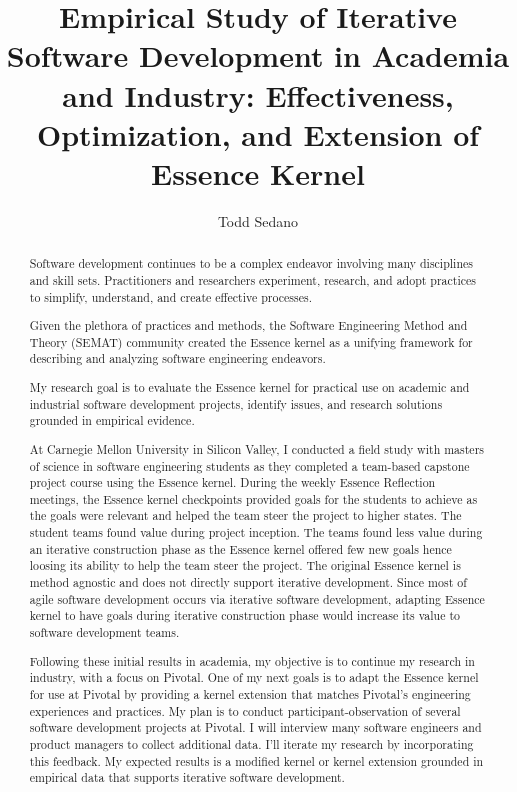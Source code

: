 \documentclass[preprint,12pt,3p]{elsarticle}
\begin{document}
\begin{frontmatter}

\title{Empirical Study of Iterative Software Development in Academia and Industry: Effectiveness, Optimization, and Extension of Essence Kernel}

\author{Todd Sedano}


\address{Carnegie Mellon University}
\address{Silicon Valley Campus}
\address{Moffett Field, CA 94035, USA}


\begin{abstract}
Software development continues to be a complex endeavor involving many disciplines and skill sets. Practitioners and researchers experiment, research, and adopt practices to simplify, understand, and create effective processes. 

Given the plethora of practices and methods, the Software Engineering Method and Theory (SEMAT) community created the Essence kernel as a unifying framework for describing and analyzing software engineering endeavors. 

My research goal is to evaluate the Essence kernel for practical use on academic and industrial software development projects, identify issues, and research solutions grounded in empirical evidence. 

At Carnegie Mellon University in Silicon Valley, I conducted a field study with masters of science in software engineering students as they completed a team-based capstone project course using the Essence kernel. During the weekly Essence Reflection meetings, the Essence kernel checkpoints provided goals for the students to achieve as the goals were relevant and helped the team steer the project to higher states. The student teams found value during project inception. The teams found less value during an iterative construction phase as the Essence kernel offered few new goals hence loosing its ability to help the team steer the project. The original Essence kernel is method agnostic and does not directly support iterative development. Since most of agile software development occurs via iterative software development, adapting Essence kernel to have goals during iterative construction phase would increase its value to software development teams.

Following these initial results in academia, my objective is to continue my research in industry, with a focus on Pivotal. One of my next goals is to adapt the Essence kernel for use at Pivotal by providing a kernel extension that matches Pivotal's engineering experiences and practices. My plan is to conduct participant-observation of several software development projects at Pivotal. I will interview many software engineers and product managers to collect additional data. I'll iterate my research by incorporating this feedback. My expected results is a modified kernel or kernel extension grounded in empirical data that supports iterative software development. 


\end{abstract}
\end{frontmatter}
\end{document}

